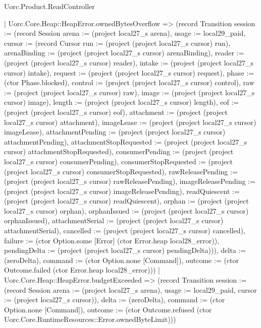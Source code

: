 \begin{lexlean}{Uorc.Product.ReadController}
\begin{semanticmodule}
{    | Uorc.Core.Heap::HeapError.ownedBytesOverflow => (record Transition {session := (record Session {arena := (project local27_s arena), usage := local29_paid, cursor := (record Cursor {run := (project (project local27_s cursor) run), arenaBinding := (project (project local27_s cursor) arenaBinding), reader := (project (project local27_s cursor) reader), intake := (project (project local27_s cursor) intake), request := (project (project local27_s cursor) request), phase := (ctor Phase.blocked), control := (project (project local27_s cursor) control), raw := (project (project local27_s cursor) raw), image := (project (project local27_s cursor) image), length := (project (project local27_s cursor) length), eof := (project (project local27_s cursor) eof), attachment := (project (project local27_s cursor) attachment), imageLease := (project (project local27_s cursor) imageLease), attachmentPending := (project (project local27_s cursor) attachmentPending), attachmentStopRequested := (project (project local27_s cursor) attachmentStopRequested), consumerPending := (project (project local27_s cursor) consumerPending), consumerStopRequested := (project (project local27_s cursor) consumerStopRequested), rawReleasePending := (project (project local27_s cursor) rawReleasePending), imageReleasePending := (project (project local27_s cursor) imageReleasePending), readQuiescent := (project (project local27_s cursor) readQuiescent), orphan := (project (project local27_s cursor) orphan), orphanIssued := (project (project local27_s cursor) orphanIssued), attachmentSerial := (project (project local27_s cursor) attachmentSerial), cancelled := (project (project local27_s cursor) cancelled), failure := (ctor Option.some [Error] (ctor Error.heap local28_error)), pendingDelta := (project (project local27_s cursor) pendingDelta)})}), delta := (zeroDelta), command := (ctor Option.none [Command]), outcome := (ctor Outcome.failed (ctor Error.heap local28_error))})
    | Uorc.Core.Heap::HeapError.budgetExceeded => (record Transition {session := (record Session {arena := (project local27_s arena), usage := local29_paid, cursor := (project local27_s cursor)}), delta := (zeroDelta), command := (ctor Option.none [Command]), outcome := (ctor Outcome.refused (ctor Uorc.Core.RuntimeResources::Error.ownedByteLimit))})
}
\end{semanticmodule}
\end{lexlean}
